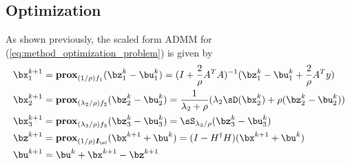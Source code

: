 \documentclass[11pt]{article}
\renewcommand{\sI}{\boldsymbol{I}}
\newcommand{\prox}{\textbf{prox}}
\begin{document}
\subsection{Optimization}

As shown previously, the scaled form ADMM for (\ref{eq:method_optimization_problem}) is given by 
\begin{align*}
    \bx_1^{k+1}
        &= \prox_{(1/\rho)f_1}(\bz_1^k - \bu_1^k) 
        = (I + \frac{2}{\rho} A^TA)^{-1} ( \bz_1^k - \bu_1^k + \frac{2}{\rho}A^T y) \\
    \bx_2^{k+1}
        &= \prox_{(\lambda_2/\rho)f_2}(\bz_2^k - \bu_2^k) 
        = \frac{1}{\lambda_2+\rho} (\lambda_2 \sD(\bx_2^k) + \rho(\bz_2^k - \bu_2^k)) \\
    \bx_3^{k+1}
        &= \prox_{(\lambda_3/\rho)f_3} (\bz_3^k - \bu_3^k) 
        = \sS_{\lambda_3/\rho}(\bz_3^k - \bu_3^k) \\
    \bz^{k+1}
        &= \prox_{(1/\rho)\sI_{\sC}}(\bx^{k+1} + \bu^k)
        = (I - H^{\dagger}H)(\bx^{k+1}+\bu^k) \\
    \bu^{k+1}
        &= \bu^{k} + \bx^{k+1} - \bz^{k+1}
\end{align*}
 



\newpage
\printbibliography
\end{document}

